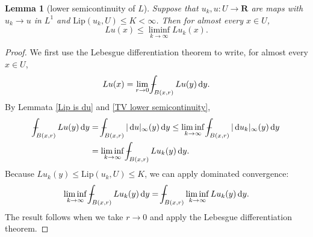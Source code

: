 \documentclass[reqno,11pt]{amsart}
\newcommand{\RR}{\mathbf{R}}
\newcommand*\dif{\mathop{}\!\mathrm{d}}
\DeclareMathOperator{\dist}{dist}
\DeclareMathOperator{\len}{len}
\newcommand{\Lip}{\mathrm{Lip}}
\newcommand{\dfn}[1]{\emph{#1}\index{#1}}
\newtheorem{lemma}[theorem]{Lemma}
\theoremstyle{definition}
\newtheorem{definition}[theorem]{Definition}
\numberwithin{equation}{section}
\def\Xint#1{\mathchoice
{\XXint\displaystyle\textstyle{#1}}%
{\XXint\textstyle\scriptstyle{#1}}%
{\XXint\scriptstyle\scriptscriptstyle{#1}}%
{\XXint\scriptscriptstyle\scriptscriptstyle{#1}}%
\!\int}
\def\XXint#1#2#3{{\setbox0=\hbox{$#1{#2#3}{\int}$ }
\vcenter{\hbox{$#2#3$ }}\kern-.6\wd0}}
\def\dashint{\Xint-}
\begin{document}
\begin{lemma}[lower semicontinuity of $L$]\label{Lip is lower semicontinuous}
Suppose that $u_k, u: U \to \RR$ are maps with $u_k \to u$ in $L^1$ and $\Lip(u_k, U) \leq K < \infty$.
Then for almost every $x \in U$,
$$Lu(x) \leq \liminf_{k \to \infty} Lu_k(x).$$
\end{lemma}
\begin{proof} 
We first use the Lebesgue differentiation theorem to write, for almost every $x \in U$,
$$Lu(x) = \lim_{r \to 0} \dashint_{B(x, r)} Lu(y) \dif y.$$
By Lemmata \ref{Lip is du} and \ref{TV lower semicontinuity},
\begin{align*}
\dashint_{B(x, r)} Lu(y) \dif y 
&= \dashint_{B(x, r)} |\dif u|_\infty(y) \dif y 
\leq \liminf_{k \to \infty} \dashint_{B(x, r)} |\dif u_k|_\infty(y) \dif y \\
&= \liminf_{k \to \infty} \dashint_{B(x, r)} Lu_k(y) \dif y.
\end{align*}
Because $Lu_k(y) \leq \Lip(u_k, U) \leq K$, we can apply dominated convergence:
$$\liminf_{k \to \infty} \dashint_{B(x, r)} Lu_k(y) \dif y = \dashint_{B(x, r)} \liminf_{k \to \infty} Lu_k(y) \dif y.$$
The result follows when we take $r \to 0$ and apply the Lebesgue differentiation theorem.
\end{proof}


\end{document}
